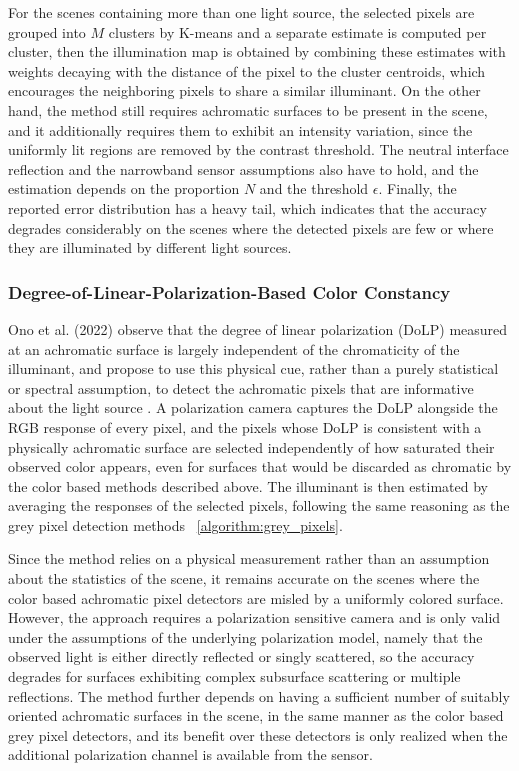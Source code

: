 For the scenes containing more than one light source, the selected pixels are grouped into $M$ clusters by K-means and a separate estimate is computed per cluster, then the illumination map is obtained by combining these estimates with weights decaying with the distance of the pixel to the cluster centroids, which encourages the neighboring pixels to share a similar illuminant. On the other hand, the method still requires achromatic surfaces to be present in the scene, and it additionally requires them to exhibit an intensity variation, since the uniformly lit regions are removed by the contrast threshold. The neutral interface reflection and the narrowband sensor assumptions also have to hold, and the estimation depends on the proportion $N$ and the threshold $\epsilon$. Finally, the reported error distribution has a heavy tail, which indicates that the accuracy degrades considerably on the scenes where the detected pixels are few or where they are illuminated by different light sources.

\subsubsection{Degree-of-Linear-Polarization-Based Color Constancy}
\label{algorithm:dolp_color_constancy}

Ono et al. (2022) observe that the degree of linear polarization (DoLP) measured at an achromatic surface is largely independent of the chromaticity of the illuminant, and propose to use this physical cue, rather than a purely statistical or spectral assumption, to detect the achromatic pixels that are informative about the light source \cite{ono2022degree}. A polarization camera captures the DoLP alongside the RGB response of every pixel, and the pixels whose DoLP is consistent with a physically achromatic surface are selected independently of how saturated their observed color appears, even for surfaces that would be discarded as chromatic by the color based methods described above. The illuminant is then estimated by averaging the responses of the selected pixels, following the same reasoning as the grey pixel detection methods ~\ref{algorithm:grey_pixels}.

Since the method relies on a physical measurement rather than an assumption about the statistics of the scene, it remains accurate on the scenes where the color based achromatic pixel detectors are misled by a uniformly colored surface. However, the approach requires a polarization sensitive camera and is only valid under the assumptions of the underlying polarization model, namely that the observed light is either directly reflected or singly scattered, so the accuracy degrades for surfaces exhibiting complex subsurface scattering or multiple reflections. The method further depends on having a sufficient number of suitably oriented achromatic surfaces in the scene, in the same manner as the color based grey pixel detectors, and its benefit over these detectors is only realized when the additional polarization channel is available from the sensor.

